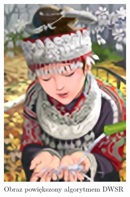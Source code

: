 \begin{figure}[ht]
\begin{minipage}[t]{0.3\linewidth}
        \includegraphics[width=\linewidth]{Rozdziały/02.Podstawy_teoretyczne/Obrazy/comic_DWSR_x4.png}
        \caption{Obraz powiększony algorytmem DWSR}
        \label{fig:image12}
    \end{minipage}
    \hspace{0.5cm}
    \begin{minipage}[t]{0.3\linewidth}

\end{minipage}
\end{figure}
